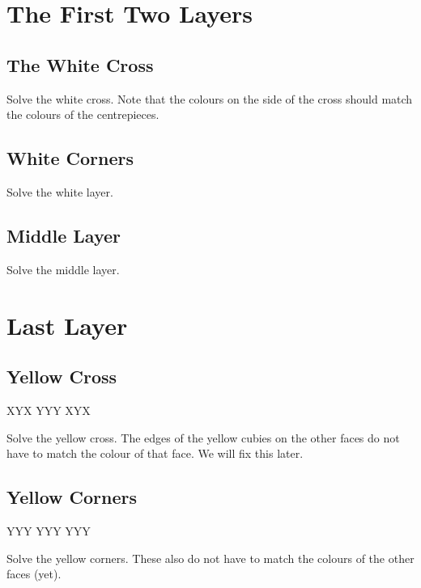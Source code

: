 \documentclass{article}
\begin{document}
    \section{The First Two Layers}

    \subsection{The White Cross}
        \RubikCubeGreyWY

        \begin{goal}
            Solve the white cross.
            Note that the colours on the side of the cross should match the colours of the centrepieces.
        \end{goal}

    \subsection{White Corners}
        \RubikCubeGreyWY

        \begin{goal}
            Solve the white layer.
        \end{goal}

    \subsection{Middle Layer}
        \RubikCubeGreyWY

        \begin{goal}
        Solve the middle layer.
        \end{goal}

    \section{Last Layer}
    \subsection{Yellow Cross}
        \RubikCubeGreyAll
        \RubikFaceUp XYX YYY XYX

        \begin{goal}[\DrawRubikFaceUp]
            Solve the yellow cross.
            The edges of the yellow cubies on the other faces do not have to match the colour of that face.
            We will fix this later.
        \end{goal}

    \subsection{Yellow Corners}
        \RubikCubeGreyAll
        \RubikFaceUp YYY YYY YYY

        \begin{goal}[\DrawRubikFaceUp]
            Solve the yellow corners.
            These also do not have to match the colours of the other faces (yet).
        \end{goal}
\end{document}
